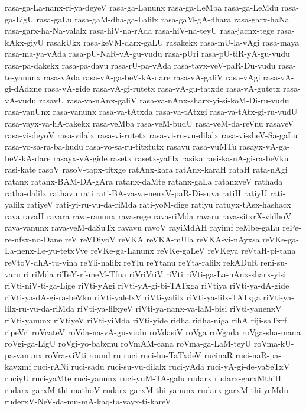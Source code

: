 {rasa-ga-La-nanx-ri-ya-deyeV
rasa-ga-Lanunx
rasa-ga-LeMba
rasa-ga-LeMdu
rasa-ga-LigU
rasa-gaLu
rasa-gaM-dha-ga-Lalilx
rasa-gaM-gA-dhara
rasa-garx-haNa
rasa-garx-ha-Na-valalx
rasa-hiV-na-rAda
rasa-hiV-na-teyU
rasa-jacnx-tege
rasa-kAkx-giyU
rasakUkx
rasa-keVM-darx-gaLU
rasakekx
rasa-mU-la-vAgi
rasa-maya
rasa-ma-ya-vAda
rasa-pU-NaR-vA-gu-vudu
rasa-pUri
rasa-pU-tiR-yA-gu-vudu
rasa-pa-dakekx
rasa-pa-davu
rasa-rU-pa-vAda
rasa-tavx-veV-paR-Du-vudu
rasa-te-yanunx
rasa-vAda
rasa-vA-ga-beV-kA-dare
rasa-vA-galiV
rasa-vAgi
rasa-vA-gi-dAdxne
rasa-vA-gide
rasa-vA-gi-rutetx
rasa-vA-gu-tatxde
rasa-vA-gutetx
rasa-vA-vudu
rasavU
rasa-va-nAnx-galiV
rasa-va-nAnx-sharx-yi-si-koM-Di-ru-vudu
rasa-vanUnx
rasa-vanunx
rasa-va-tAtxda
rasa-va-tAtxgi
rasa-va-tAtx-gi-ru-vudU
rasa-vayx-va-hA-rakekx
rasa-veMba
rasa-veM-budU
rasa-veM-da-reVnu
rasaveV
rasa-vi-deyoV
rasa-vilalx
rasa-vi-rutetx
rasa-vi-ru-vu-dilalx
rasa-vi-sheV-Sa-gaLu
rasa-vo-sa-ra-ba-hudu
rasa-vo-sa-ru-titxtutx
rasavu
rasa-vuMTu
rasayx-vA-ga-beV-kA-dare
rasayx-vA-gide
rasetx
rasetx-yalilx
rasika
rasi-ka-nA-gi-ra-beVku
rasi-kate
rasoV
rasoV-tapx-titxge
ratAnx-kara
ratAnx-karaH
rataH
rata-nAgi
ratanx
ratanx-BAM-DA-gAra
ratanx-daMte
ratanx-gaLa
ratanxveV
rathada
ratha-dalilx
rathavu
rati
rati-BA-va-va-nenxV-paR-Di-suva
ratiH
ratiyU
rati-yalilx
ratiyeV
rati-yi-ru-vu-da-riMda
rati-yoM-dige
ratiyu
ratuyx-tAsx-hashacx
rava
ravaH
ravara
rava-ranunx
rava-rege
rava-riMda
ravaru
rava-sitxrX-vidhoV
rava-vanunx
rava-veM-daSuTx
ravavu
ravoV
rayiMdAH
rayimf
reMbe-gaLu
rePe-re-nfsx-no-Dane
reV
reVDiyoV
reVKA
reVKA-mUla
reVKA-vi-nAyxsa
reVKe-ga-La-nenx-Le-yu-tetxVve
reVKe-ga-Lanunx
reVKe-gaLeV
reVKeya
reVtaH-pi-tana
reVtoV-dhA-tu-vina
reYli-nalilx
reYlu
reYtanu
reYta-ralilx
rekADuR
reni-su-varu
ri
riMda
riTeY-rf-meM-Tfna
riVriVriV
riVti
riVti-ga-La-nAnx-sharx-yisi
riVti-niV-ti-ga-Lige
riVti-yAgi
riVti-yA-gi-bi-TATxga
riVtiya
riVti-ya-dA-gide
riVti-ya-dA-gi-ra-beVku
riVti-yalelxV
riVti-yalilx
riVti-ya-lilx-TATxga
riVti-ya-lilx-ru-vu-da-riMda
riVti-ya-lilxyeV
riVti-ya-nanx-va-laM-bisi
riVti-yanenxV
riVti-yanunx
riVtiyeV
riVti-yiMda
riVti-yide
ridha
ridha-niga
rihA
riji-saTxrf
ripeVri
roVcateV
roVda-na-vA-gu-vudu
roVdasiV
roVga
roVgada
roVga-sha-mana
roVgi-ga-LigU
roVgi-yo-babxnu
roVmAM-cana
roVma-ga-LaM-teyU
roVma-kU-pa-vanunx
roVra-viVti
round
ru
ruci
ruci-hu-TaTxdeV
rucinaR
ruci-naR-pa-kavxmf
ruci-rANi
ruci-sadu
ruci-su-vu-dilalx
ruci-yAda
ruci-yA-gi-de-yaSeTxV
ruciyU
ruci-yaMte
ruci-yanunx
ruci-yuM-TA-galu
rudarx
rudarx-garxMthiH
rudarx-garxM-thi-mathoV
rudarx-garxM-thi-yanunx
rudarx-garxM-thi-yeMdu
ruderxV-NeV-da-mu-mA-kaq-ta-vayx-ti-kareV
}
